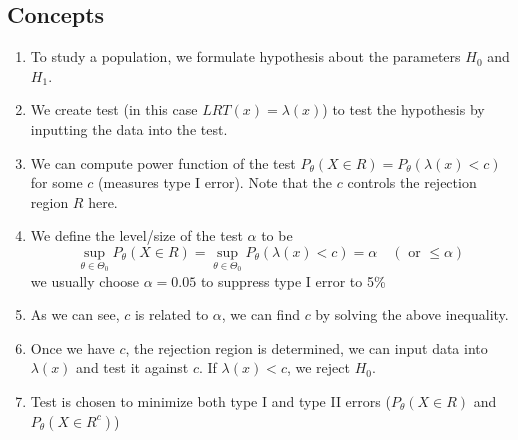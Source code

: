 \documentclass[12pt]{article}
\begin{document}
\subsection{Concepts}
\begin{enumerate}
	\item To study a population, we formulate hypothesis about the parameters $H_0$ and $H_1$. 
	\item We create test (in this case $LRT(x) = \lambda(x)$) to test the hypothesis by inputting the data into the test.
	\item We can compute power function of the test $P_\theta(X\in R) = P_\theta(\lambda(x) < c)$ for some $c$ (measures type I error). Note that the $c$ controls the rejection region $R$ here.
	\item We define the level/size of the test $\alpha$ to be $$\sup_{\theta \in \Theta_0}P_\theta(X\in R) = \sup_{\theta \in \Theta_0} P_\theta(\lambda(x) < c) = \alpha  \quad (\text{ or } \leq \alpha )$$ 
	we usually choose $\alpha = 0.05$ to suppress type I error to 5\%
	\item As we can see, $c$ is related to $\alpha$, we can find $c$ by solving the above inequality.
	\item Once we have $c$,  the rejection region is determined, we can input data into $\lambda(x)$ and test it against $c$. If $\lambda(x) < c$, we reject $H_0$.
	\item Test is chosen to minimize both type I and type II errors ($P_\theta(X\in R)$ and $P_\theta(X\in R^c)$)
\end{enumerate}
\end{document}
